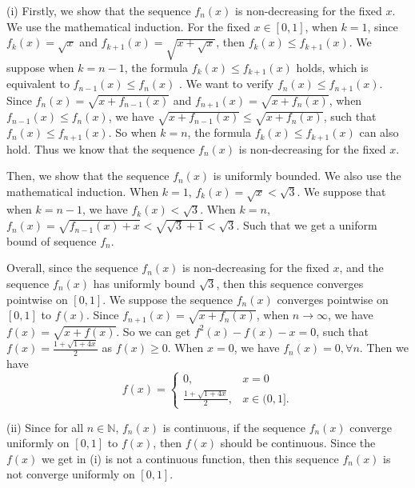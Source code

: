 \documentclass[12pt,a4paper]{ctexart}
\begin{document}
(i) Firstly, we show that the sequence $f_{n}(x)$ is non-decreasing for the fixed $x$. We use the mathematical induction. For the fixed $x \in [0, 1]$, when $k = 1$, since $f_{k} (x) = \sqrt{x}$ and $f_{k+1} (x) = \sqrt{x + \sqrt{x}}$, then $f_{k}(x) \leq f_{k+1}(x)$. We suppose when $k = n-1$, the formula $f_{k}(x) \leq f_{k+1}(x)$ holds, which is equivalent to $f_{n-1}(x) \leq f_{n}(x)$ . We want to verify $f_{n}(x) \leq f_{n+1}(x)$. Since $f_{n}(x) = \sqrt{x + f_{n-1}(x)}$ and $f_{n+1}(x) = \sqrt{x + f_{n}(x)}$, when $f_{n-1}(x) \leq f_{n}(x)$, we have $\sqrt{x + f_{n-1}(x)} \leq \sqrt{x + f_{n}(x)}$, such that $f_{n}(x) \leq f_{n+1}(x)$. So when $k = n$, the formula $f_{k}(x) \leq f_{k+1}(x)$ can also hold. Thus we know that the sequence $f_{n}(x)$ is non-decreasing for the fixed $x$.

Then, we show that the sequence $f_{n}(x)$ is uniformly bounded. We also use the mathematical induction. When $k =1$, $f_{k}(x) = \sqrt{x} < \sqrt{3}$. We suppose that when $k = n-1$, we have $f_{k}(x) < \sqrt{3}$. When $k =n$, $f_{n}(x) = \sqrt{f_{n-1}(x) + x} < \sqrt{\sqrt{3}+1} < \sqrt{3}$. Such that we get a uniform bound of sequence $f_{n}$.

Overall, since the sequence $f_{n}(x)$ is non-decreasing for the fixed $x$, and the sequence $f_{n}(x)$ has uniformly bound $\sqrt{3}$, then this sequence converges pointwise on $[0, 1]$. We suppose the sequence $f_{n}(x)$ converges pointwise on $[0, 1]$ to $f(x)$. Since $f_{n+1}(x) = \sqrt{x + f_{n}(x)}$, when $n \to \infty$, we have $f(x) = \sqrt{x + f(x)}$. So we can get $f^{2}(x) - f(x) - x = 0$, such that $f(x) = \frac{1 + \sqrt{1 + 4 x}}{2}$ as $f(x) \geq 0$. When $x =  0$, we have $f_{n} (x) = 0, \forall n$. Then we have
\begin{equation*}
f(x) =
\left\{
             \begin{array}{cl}
             0, & x = 0 \\
             \frac{1 + \sqrt{1 + 4 x}}{2}, & x \in (0, 1].
             \end{array}
\right.
\end{equation*}

(ii) Since for all $n \in \mathbb{N}$, $ f_{n}(x)$ is continuous, if the sequence $f_{n}(x)$ converge uniformly on $[0, 1]$ to $f(x)$, then $f(x)$ should be continuous. Since the $f(x)$ we get in (i) is not a continuous function, then this sequence $f_{n}(x)$ is not converge uniformly on $[0, 1]$.

\vspace{8pt}
\end{document}
